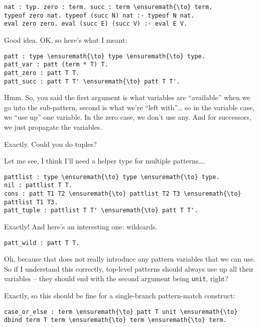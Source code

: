 \begin{verbatim}
nat : typ. zero : term. succ : term \ensuremath{\to} term.
typeof zero nat. typeof (succ N) nat :- typeof N nat.
eval zero zero. eval (succ E) (succ V) :- eval E V.
\end{verbatim}

\heroADVISOR{} Good idea. OK, so here's what I meant:

\begin{verbatim}
patt : type \ensuremath{\to} type \ensuremath{\to} type.
patt_var : patt (term * T) T.
patt_zero : patt T T.
patt_succ : patt T T' \ensuremath{\to} patt T T'.
\end{verbatim}

\heroSTUDENT{} Hmm. So, you said the first argument is what variables are
``available'' when we go into the sub-pattern, second is what we're
``left with''\ldots{} so in the variable case, we ``use up'' one
variable. In the zero case, we don't use any. And for successors, we
just propagate the variables.

\heroADVISOR{} Exactly. Could you do tuples?

\heroSTUDENT{} Let me see, I think I'll need a helper type for multiple
patterns\ldots{}.

\begin{verbatim}
pattlist : type \ensuremath{\to} type \ensuremath{\to} type.
nil : pattlist T T.
cons : patt T1 T2 \ensuremath{\to} pattlist T2 T3 \ensuremath{\to} pattlist T1 T3.
patt_tuple : pattlist T T' \ensuremath{\to} patt T T'.
\end{verbatim}

\heroADVISOR{} Exactly! And here's an interesting one: wildcards.

\begin{verbatim}
patt_wild : patt T T.
\end{verbatim}

\heroSTUDENT{} Oh, because that does not really introduce any pattern
variables that we can use. So if I understand this correctly, top-level
patterns should always use up all their variables -- they should end
with the second argument being \texttt{unit}, right?

\heroADVISOR{} Exactly, so this should be fine for a single-branch
pattern-match construct:

\begin{verbatim}
case_or_else : term \ensuremath{\to} patt T unit \ensuremath{\to} dbind term T term \ensuremath{\to} term \ensuremath{\to} term.
\end{verbatim}

